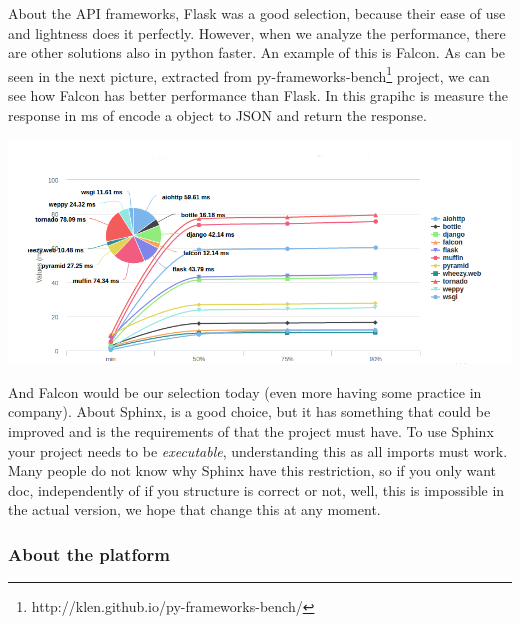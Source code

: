 \noindent About the API frameworks, Flask was a good selection, because their ease of use
and lightness does it perfectly. However, when we analyze the performance, there are
other solutions also in python faster. An example of this is Falcon. As can be
seen in the next picture, extracted from py-frameworks-bench\footnote{
http://klen.github.io/py-frameworks-bench/} project, we can see how Falcon has
better performance than Flask. In this grapihc is measure the response in ms
of encode a object to JSON and return the response.

\begin{center}
\includegraphics[scale=0.5]{img/graphics/frameworks.png}
\end{center}

\noindent And Falcon would be our selection today (even more having some practice in
company).
\linebreak
\linebreak
\noindent About Sphinx, is a good choice, but it has something that could be improved and
is the requirements of that the project must have. To use Sphinx your project
needs to be \textit{executable}, understanding this as all imports must work.
Many people do not know why Sphinx have this restriction, so if you
only want doc, independently of if you structure is correct or not, well, this is
impossible in the actual version, we hope that change this at any moment.

\subsubsection{About the platform}

